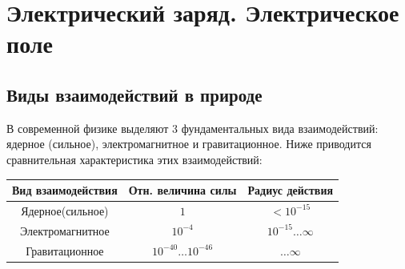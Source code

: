 \chapter{Электрический заряд. Электрическое поле}
\section{Виды взаимодействий в природе}
    В современной физике выделяют 3 фундаментальных вида взаимодействий:
    ядерное (сильное), электромагнитное и гравитационное. Ниже приводится 
    сравнительная характеристика этих взаимодействий:

    \begin{table}[h]
        \center
        \begin{tabular}[c]{|c|c|c|}\hline
            Вид взаимодействия & Отн. величина силы 
            & Радиус действия \\ \hline
            Ядерное(сильное) & \(1\) & \(<10^{-15}\) \\ \hline
            
            Электромагнитное & \(10^{-4}\) & \(10^{-15} \ldots \infty\)
            \\ \hline
            
            Гравитационное & \(10^{-40} \ldots 10^{-46}\) & \(\ldots \infty\) 
            \\ \hline
        \end{tabular}
    \end{table}
  
